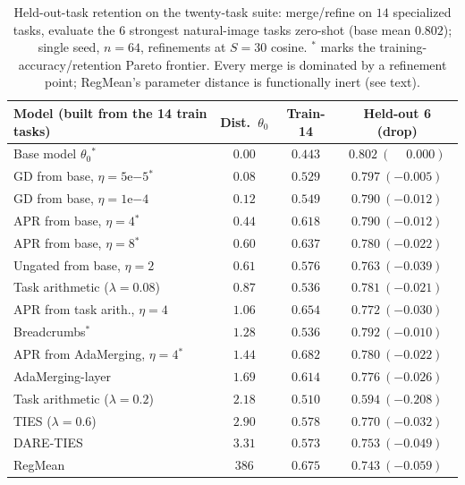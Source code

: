 \documentclass[11pt]{article}
\begin{document}
\begin{table}[t]
\centering
\small
\setlength{\tabcolsep}{5pt}
\caption{Held-out-task retention on the twenty-task suite: merge/refine on $14$ specialized tasks, evaluate the $6$ strongest natural-image tasks zero-shot (base mean $0.802$); single seed, $n=64$, refinements at $S{=}30$ cosine. $^\ast$ marks the training-accuracy/retention Pareto frontier. Every merge is dominated by a refinement point; RegMean's parameter distance is functionally inert (see text).}
\label{tab:clip20heldout}
\begin{tabular}{lccc}
\toprule
Model (built from the 14 train tasks) & Dist.\ $\theta_0$ & Train-14 & Held-out 6 (drop) \\
\midrule
Base model $\theta_0$$^\ast$          & $0.00$ & $0.443$ & $0.802\ (\phantom{-}0.000)$ \\
GD from base, $\eta{=}5\mathrm{e}{-5}$$^\ast$ & $0.08$ & $0.529$ & $0.797\ (-0.005)$ \\
GD from base, $\eta{=}1\mathrm{e}{-4}$ & $0.12$ & $0.549$ & $0.790\ (-0.012)$ \\
APR from base, $\eta{=}4$$^\ast$      & $0.44$ & $0.618$ & $0.790\ (-0.012)$ \\
APR from base, $\eta{=}8$$^\ast$      & $0.60$ & $0.637$ & $0.780\ (-0.022)$ \\
Ungated from base, $\eta{=}2$         & $0.61$ & $0.576$ & $0.763\ (-0.039)$ \\
Task arithmetic ($\lambda{=}0.08$)    & $0.87$ & $0.536$ & $0.781\ (-0.021)$ \\
APR from task arith., $\eta{=}4$      & $1.06$ & $0.654$ & $0.772\ (-0.030)$ \\
Breadcrumbs$^\ast$                    & $1.28$ & $0.536$ & $0.792\ (-0.010)$ \\
APR from AdaMerging, $\eta{=}4$$^\ast$ & $1.44$ & $\mathbf{0.682}$ & $0.780\ (-0.022)$ \\
AdaMerging-layer                      & $1.69$ & $0.614$ & $0.776\ (-0.026)$ \\
Task arithmetic ($\lambda{=}0.2$)     & $2.18$ & $0.510$ & $0.594\ (-0.208)$ \\
TIES ($\lambda{=}0.6$)                & $2.90$ & $0.578$ & $0.770\ (-0.032)$ \\
DARE-TIES                             & $3.31$ & $0.573$ & $0.753\ (-0.049)$ \\
RegMean                               & $386$  & $0.675$ & $0.743\ (-0.059)$ \\
\bottomrule
\end{tabular}
\end{table}
\end{document}
